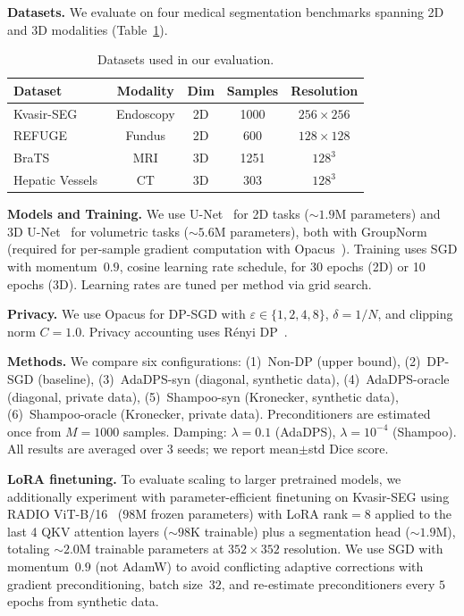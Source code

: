 \documentclass[runningheads]{llncs}
\begin{document}
\textbf{Datasets.}
We evaluate on four medical segmentation benchmarks spanning 2D and 3D modalities (Table~\ref{tab:datasets}).

\begin{table}[t]
\centering
\caption{Datasets used in our evaluation.}\label{tab:datasets}
\renewcommand{\arraystretch}{1.1}
\small
\begin{tabular}{lcccc}
\toprule
\textbf{Dataset} & \textbf{Modality} & \textbf{Dim} & \textbf{Samples} & \textbf{Resolution} \\
\midrule
Kvasir-SEG~\cite{jha2020kvasir} & Endoscopy & 2D & 1000 & $256{\times}256$ \\
REFUGE~\cite{orlando2020refuge} & Fundus & 2D & 600 & $128{\times}128$ \\
BraTS~\cite{brats2024} & MRI & 3D & 1251 & $128^3$ \\
Hepatic Vessels~\cite{antonelli2022medical} & CT & 3D & 303 & $128^3$ \\
\bottomrule
\end{tabular}
\end{table}

\textbf{Models and Training.}
We use U-Net~\cite{ronneberger2015unet} for 2D tasks (${\sim}1.9$M parameters) and 3D U-Net~\cite{cicek20163d} for volumetric tasks (${\sim}5.6$M parameters), both with GroupNorm~\cite{wu2018group} (required for per-sample gradient computation with Opacus~\cite{opacus}). Training uses SGD with momentum~$0.9$, cosine learning rate schedule, for 30 epochs (2D) or 10 epochs (3D). Learning rates are tuned per method via grid search.

\textbf{Privacy.}
We use Opacus for DP-SGD with $\varepsilon\in\{1,2,4,8\}$, $\delta=1/N$, and clipping norm $C{=}1.0$. Privacy accounting uses R\'{e}nyi DP~\cite{Mironov_2017}.

\textbf{Methods.}
We compare six configurations: (1)~Non-DP (upper bound), (2)~DP-SGD (baseline), (3)~AdaDPS-syn (diagonal, synthetic data), (4)~AdaDPS-oracle (diagonal, private data), (5)~Shampoo-syn (Kronecker, synthetic data), (6)~Shampoo-oracle (Kronecker, private data). Preconditioners are estimated once from $M{=}1000$ samples. Damping: $\lambda{=}0.1$ (AdaDPS), $\lambda{=}10^{-4}$ (Shampoo). All results are averaged over 3 seeds; we report mean$\pm$std Dice score.

\textbf{LoRA finetuning.}
To evaluate scaling to larger pretrained models, we additionally experiment with parameter-efficient finetuning on Kvasir-SEG using RADIO ViT-B/16~\cite{ranzinger2024radio} ($98$M frozen parameters) with LoRA rank$=8$ applied to the last 4 QKV attention layers (${\sim}98$K trainable) plus a segmentation head (${\sim}1.9$M), totaling ${\sim}2.0$M trainable parameters at $352{\times}352$ resolution. We use SGD with momentum~$0.9$ (not AdamW) to avoid conflicting adaptive corrections with gradient preconditioning, batch size~$32$, and re-estimate preconditioners every $5$ epochs from synthetic data.
\end{document}
